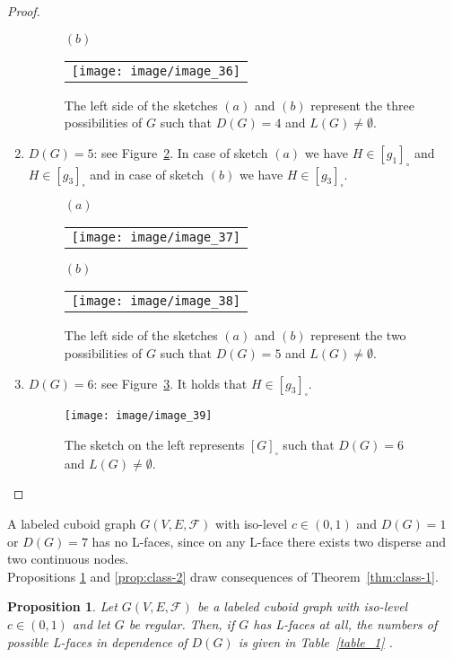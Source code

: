 \documentclass[a4paper,11pt]{article}
\newtheorem{proposition}[theorem]{Proposition}
\begin{document}
\begin{proof}
\begin{enumerate}
\begin{figure}[!ht]
\hspace{0.8cm}$(b)$
\begin{tabular}[c]{l}
\texttt{[image: image/image\_36]}
\end{tabular}
\caption{The left side of the sketches $(a)$ and $(b)$ represent the three possibilities of $G$ such that $D(G)=4$
and $L(G)\neq\emptyset$.}
\label{image_35_36}
\end{figure}
\FloatBarrier
\item $D(G)=5$: see Figure~\ref{image_37_38}. In case of sketch $(a)$ we have $H\in [g_1]_{\circ}$ and
$H\in [g_3]_{\square}$ and in case of sketch $(b)$ we have $H\in [g_3]_{\square}$.
\begin{figure}[!ht]
$(a)$
\begin{tabular}[c]{l}
\texttt{[image: image/image\_37]}
\end{tabular}
\hspace{0.8cm}$(b)$
\begin{tabular}[c]{l}
\texttt{[image: image/image\_38]}
\end{tabular}
\caption{The left side of the sketches $(a)$ and $(b)$ represent the two possibilities of $G$ such that $D(G)=5$
and $L(G)\neq\emptyset$.}
\label{image_37_38}
\end{figure}
\FloatBarrier
\item $D(G)=6$: see Figure~\ref{image_39}. It holds that $H\in [g_3]_{\square}$.
\begin{figure}[!ht]
\texttt{[image: image/image\_39]}
\caption{The sketch on the left represents $[G]_{\square}$ such that $D(G)=6$ and $L(G)\neq\emptyset$.}
\label{image_39}
\end{figure}
\end{enumerate}
\vspace{-0.9cm}
\end{proof}
\FloatBarrier
{}A labeled cuboid graph $G(V,E,\mathcal{F})$ with iso-level $c\in (0,1)$ and $D(G)=1$
or $D(G)=7$ has no L-faces, since on any L-face there exists two disperse and two continuous nodes.\\

Propositions \ref{prop:class-1} and \ref{prop:class-2} draw consequences of Theorem~\ref{thm:class-1}.
\begin{proposition}Let $G(V,E,\mathcal{F})$ be a labeled cuboid graph with iso-level $c\in (0,1)$
and let $G$ be regular. Then, if $G$ has L-faces at all, the numbers of possible L-faces in dependence
of $D(G)$ is given in Table~\ref{table_1} .
\label{prop:class-1}
\end{proposition}
\end{document}
